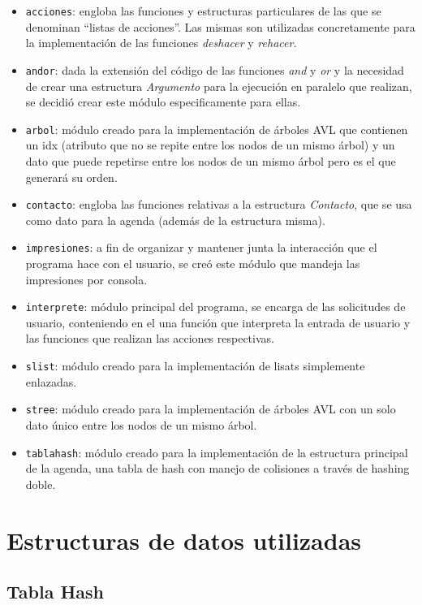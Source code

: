 \documentclass[11pt]{article}
\begin{document}
\begin{itemize}
  \item \verb|acciones|: engloba las funciones y estructuras particulares de las que se denominan ``listas de acciones''. Las mismas son utilizadas concretamente para la implementaci\'on de las funciones \emph{deshacer} y \emph{rehacer}. 
  \item \verb|andor|: dada la extensi\'on del c\'odigo de las funciones \emph{and} y \emph{or} y la necesidad de crear una estructura \emph{Argumento} para la ejecuci\'on en paralelo que realizan, se decidi\'o crear este m\'odulo especificamente para ellas.
  \item \verb|arbol|: m\'odulo creado para la implementaci\'on de \'arboles AVL que contienen un idx (atributo que no se repite entre los nodos de un mismo \'arbol) y un dato que puede repetirse entre los nodos de un mismo \'arbol pero es el que generar\'a su orden.
  \item \verb|contacto|: engloba las funciones relativas a la estructura \emph{Contacto}, que se usa como dato para la agenda (adem\'as de la estructura misma).
  \item \verb|impresiones|: a fin de organizar y mantener junta la interacci\'on que el programa hace con el usuario, se cre\'o este m\'odulo que mandeja las impresiones por consola.
  \item \verb|interprete|: m\'odulo principal del programa, se encarga de las solicitudes de usuario, conteniendo en el una funci\'on que interpreta la entrada de usuario y las funciones que realizan las acciones respectivas.
  \item \verb|slist|: m\'odulo creado para la implementaci\'on de lisats simplemente enlazadas. 
  \item \verb|stree|: m\'odulo creado para la implementaci\'on de \'arboles AVL con un solo dato \'unico entre los nodos de un mismo \'arbol. 
  \item \verb|tablahash|: m\'odulo creado para la implementaci\'on de la estructura principal de la agenda, una tabla de hash con manejo de colisiones a trav\'es de hashing doble. 
\end{itemize}

\section{Estructuras de datos utilizadas}

\subsection{Tabla Hash}
\end{document}

